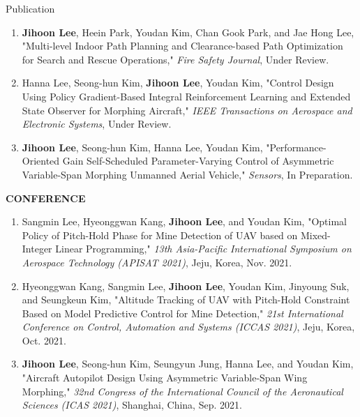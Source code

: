 \documentclass{resume}
\begin{document}
\begin{rSection}{Publication}
\begin{enumerate}
		\color{gray} 
		\item \textbf{\color{coolblack}Jihoon Lee}, Heein Park, Youdan Kim, Chan Gook Park, and Jae Hong Lee, "Multi-level Indoor Path Planning and Clearance-based Path Optimization for Search and Rescue Operations," \textit{Fire Safety Journal}, Under Review.
		
		\item Hanna Lee, Seong-hun Kim, \textbf{\color{coolblack}Jihoon Lee}, Youdan Kim, "Control Design Using Policy Gradient-Based Integral Reinforcement Learning and Extended State Observer for Morphing Aircraft," \textit{IEEE Transactions on Aerospace and Electronic Systems}, Under Review.
		
		\item \textbf{\color{coolblack}Jihoon Lee}, Seong-hun Kim, Hanna Lee, Youdan Kim, "Performance-Oriented Gain Self-Scheduled Parameter-Varying Control of Asymmetric Variable-Span Morphing Unmanned Aerial Vehicle," \textit{Sensors}, In Preparation.
	\end{enumerate}\renewcommand{\labelenumi}{\theenumi.}
	
	\textbf{CONFERENCE}
	\begin{enumerate}\renewcommand{\labelenumi}{[C\theenumi]}
		
		\item Sangmin Lee, Hyeonggwan Kang, \textbf{\color{coolblack}Jihoon Lee}, and Youdan Kim, "Optimal Policy of Pitch-Hold Phase for Mine Detection of UAV based on Mixed-Integer Linear Programming," \textit{13th Asia-Pacific International Symposium on Aerospace Technology (APISAT 2021)}, Jeju, Korea, Nov. 2021. 
				
		\item Hyeonggwan Kang, Sangmin Lee, \textbf{\color{coolblack}Jihoon Lee}, Youdan Kim, Jinyoung Suk, and Seungkeun Kim, "Altitude Tracking of UAV with Pitch-Hold Constraint Based on Model Predictive Control for Mine Detection," \textit{21st International Conference on Control, Automation and Systems (ICCAS 2021)}, Jeju, Korea, Oct. 2021. 
		
		\item \textbf{\color{coolblack}Jihoon Lee}, Seong-hun Kim, Seungyun Jung, Hanna Lee, and Youdan Kim, "Aircraft Autopilot Design Using Asymmetric Variable-Span Wing Morphing," \textit{32nd Congress of the International Council of the Aeronautical Sciences (ICAS 2021)}, Shanghai, China, Sep. 2021. 
		

\end{enumerate}
\end{rSection}
\end{document}
